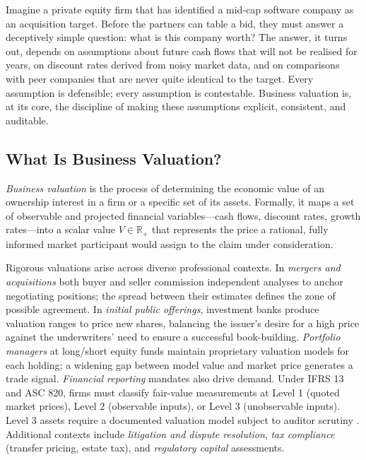 \begin{context}
Imagine a private equity firm that has identified a mid-cap software company as an
acquisition target. Before the partners can table a bid, they must answer a deceptively
simple question: what is this company worth? The answer, it turns out, depends on
assumptions about future cash flows that will not be realised for years, on discount rates
derived from noisy market data, and on comparisons with peer companies that are never
quite identical to the target. Every assumption is defensible; every assumption is
contestable. Business valuation is, at its core, the discipline of making these
assumptions explicit, consistent, and auditable.

\subsection{What Is Business Valuation?}
\label{subsec:bv-intro-definition}

\begin{definition}
\label{def:business-valuation}
\emph{Business valuation} is the process of determining the economic value of an ownership
interest in a firm or a specific set of its assets. Formally, it maps a set of
observable and projected financial variables---cash flows, discount rates, growth
rates---into a scalar value $V \in \mathbb{R}_{+}$ that represents the price a rational,
fully informed market participant would assign to the claim under consideration.
\end{definition}

Rigorous valuations arise across diverse professional contexts.
In \emph{mergers and acquisitions} both buyer and seller commission independent analyses
to anchor negotiating positions; the spread between their estimates defines the zone of
possible agreement. In \emph{initial public offerings}, investment banks produce
valuation ranges to price new shares, balancing the issuer's desire for a high price
against the underwriters' need to ensure a successful book-building. \emph{Portfolio
managers} at long/short equity funds maintain proprietary valuation models for each
holding; a widening gap between model value and market price generates a trade signal.
\emph{Financial reporting} mandates also drive demand. Under IFRS 13 and ASC 820,
firms must classify fair-value measurements at Level 1 (quoted market prices), Level 2
(observable inputs), or Level 3 (unobservable inputs). Level 3 assets require a
documented valuation model subject to auditor scrutiny \cite{iasb2011ifrs13}.
Additional contexts include \emph{litigation and dispute resolution}, \emph{tax
compliance} (transfer pricing, estate tax), and \emph{regulatory capital} assessments.


\end{context}
